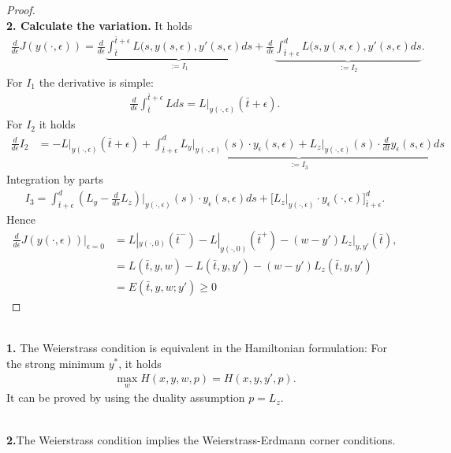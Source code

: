 \begin{proof}
\quad\\
\textbf{2. Calculate the variation.}
It holds
\begin{align*}
	\frac{d}{d\epsilon}J(y(\cdot, \epsilon)) =  \frac{d}{d\epsilon}\underbrace{\int_{\bar{t}}^{\bar{t} + \epsilon} L(s, y(s, \epsilon), y'(s, \epsilon) ds}_{:= I_1} + \frac{d}{d\epsilon} \underbrace{ \int_{\bar{t} + \epsilon}^d L(s, y(s, \epsilon), y'(s, \epsilon) ds}_{:= I_2}. 
\end{align*}
For $I_1$ the derivative is simple:
\begin{align*}
	\frac{d}{d\epsilon}\int_{\bar{t}}^{\bar{t} + \epsilon} L ds = L|_{y(\cdot, \epsilon) }(\bar{t} + \epsilon).
\end{align*}
For $I_2$ it holds
\begin{align*}
	\frac{d}{d\epsilon} I_2 &= -L|_{y(\cdot, \epsilon)}(\bar{t} + \epsilon) + \underbrace{ \int_{\bar{t} + \epsilon}^d L_y\bigg|_{y(\cdot, \epsilon)}(s) \cdot y_\epsilon (s, \epsilon) + L_z\bigg|_{y(\cdot, \epsilon)}(s) \cdot \frac{d}{dt} y_\epsilon(s, \epsilon) ds }_{:= I_3}
\end{align*}
Integration by parts
\begin{align*}
	I_3 = \int_{\bar{t} + \epsilon}^d (L_y - \frac{d}{ds}L_z)\bigg|_{y(\cdot, \epsilon)}(s) \cdot y_\epsilon(s, \epsilon) ds + \bigg[L_z\bigg|_{y(\cdot, \epsilon)} \cdot y_\epsilon(\cdot, \epsilon) \bigg]_{\bar{t} + \epsilon}^d. 
\end{align*}
Hence
\begin{align*}
	\frac{d}{d\epsilon}J(y(\cdot, \epsilon))\bigg|_{\epsilon = 0} &= L|_{y(\cdot, 0)}(\bar{t}^-) -L|_{y(\cdot, 0)}(\bar{t}^+)  - (w - y')L_z|_{y, y'}(\bar{t}), \\
	&= L(\bar{t}, y, w) - L(\bar{t}, y, y') - (w - y')L_z(\bar{t},y, y') \\
	& = E(\bar{t}, y, w; y') \ge 0
\end{align*}



\end{proof}
\begin{remark}
\quad\\
\textbf{1.} The Weierstrass condition is equivalent in the Hamiltonian formulation: For the strong minimum $y^*$, it holds
\begin{align*}
	\max_w H(x, y, w, p) = H(x, y, y', p). 
\end{align*}
It can be proved by using the duality assumption $p = L_z$.

\quad\\
\textbf{2.}The Weierstrass condition implies the Weierstrass-Erdmann corner conditions. 	
\end{remark}



